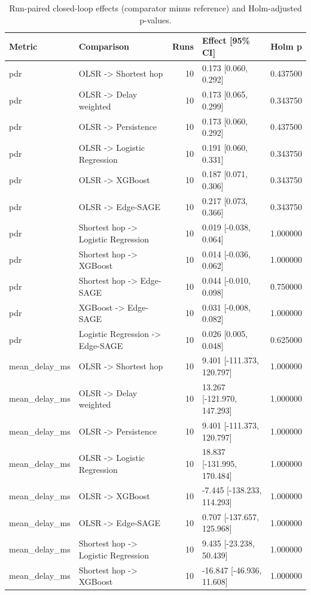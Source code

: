 \begin{table}[tb]
\caption{Run-paired closed-loop effects (comparator minus reference) and Holm-adjusted p-values.}
\label{tab:closed-loop-paired}
\begin{tabular}{llrlr}
\toprule
Metric & Comparison & Runs & Effect [95\% CI] & Holm p \\
\midrule
pdr & OLSR -> Shortest hop & 10 & 0.173 [0.060, 0.292] & 0.437500 \\
pdr & OLSR -> Delay weighted & 10 & 0.173 [0.065, 0.299] & 0.343750 \\
pdr & OLSR -> Persistence & 10 & 0.173 [0.060, 0.292] & 0.437500 \\
pdr & OLSR -> Logistic Regression & 10 & 0.191 [0.060, 0.331] & 0.343750 \\
pdr & OLSR -> XGBoost & 10 & 0.187 [0.071, 0.306] & 0.343750 \\
pdr & OLSR -> Edge-SAGE & 10 & 0.217 [0.073, 0.366] & 0.343750 \\
pdr & Shortest hop -> Logistic Regression & 10 & 0.019 [-0.038, 0.064] & 1.000000 \\
pdr & Shortest hop -> XGBoost & 10 & 0.014 [-0.036, 0.062] & 1.000000 \\
pdr & Shortest hop -> Edge-SAGE & 10 & 0.044 [-0.010, 0.098] & 0.750000 \\
pdr & XGBoost -> Edge-SAGE & 10 & 0.031 [-0.008, 0.082] & 1.000000 \\
pdr & Logistic Regression -> Edge-SAGE & 10 & 0.026 [0.005, 0.048] & 0.625000 \\
mean\_delay\_ms & OLSR -> Shortest hop & 10 & 9.401 [-111.373, 120.797] & 1.000000 \\
mean\_delay\_ms & OLSR -> Delay weighted & 10 & 13.267 [-121.970, 147.293] & 1.000000 \\
mean\_delay\_ms & OLSR -> Persistence & 10 & 9.401 [-111.373, 120.797] & 1.000000 \\
mean\_delay\_ms & OLSR -> Logistic Regression & 10 & 18.837 [-131.995, 170.484] & 1.000000 \\
mean\_delay\_ms & OLSR -> XGBoost & 10 & -7.445 [-138.233, 114.293] & 1.000000 \\
mean\_delay\_ms & OLSR -> Edge-SAGE & 10 & 0.707 [-137.657, 125.968] & 1.000000 \\
mean\_delay\_ms & Shortest hop -> Logistic Regression & 10 & 9.435 [-23.238, 50.439] & 1.000000 \\
mean\_delay\_ms & Shortest hop -> XGBoost & 10 & -16.847 [-46.936, 11.608] & 1.000000 \\

\end{tabular}
\end{table}
